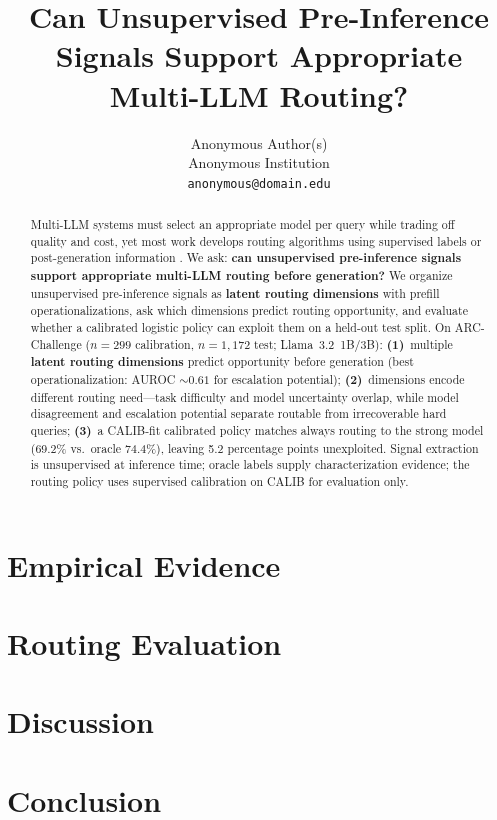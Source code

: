 \documentclass[11pt]{article}
\title{Can Unsupervised Pre-Inference Signals Support Appropriate Multi-LLM Routing?}
\author{
  Anonymous Author(s) \\
  Anonymous Institution \\
  \texttt{anonymous@domain.edu}
}
\begin{document}
\maketitle

\begin{abstract}
Multi-LLM systems must select an appropriate model per query while trading off quality and cost, yet most work develops routing algorithms using supervised labels or post-generation information \citep{ong2024routellm,guha2024smoothie}.
We ask: \textbf{can unsupervised pre-inference signals support appropriate multi-LLM routing before generation?}
We organize unsupervised pre-inference signals as \textbf{latent routing dimensions} with prefill operationalizations, ask which dimensions predict routing opportunity, and evaluate whether a calibrated logistic policy can exploit them on a held-out test split.
On ARC-Challenge ($n{=}299$ calibration, $n{=}1{,}172$ test; Llama~3.2~1B/3B): \textbf{(1)}~multiple \textbf{latent routing dimensions} predict opportunity before generation (best operationalization: AUROC ${\sim}0.61$ for escalation potential); \textbf{(2)}~dimensions encode different routing need---task difficulty and model uncertainty overlap, while model disagreement and escalation potential separate routable from irrecoverable hard queries; \textbf{(3)}~a CALIB-fit calibrated policy matches always routing to the strong model (69.2\% vs.\ oracle 74.4\%), leaving 5.2 percentage points unexploited.
Signal extraction is unsupervised at inference time; oracle labels supply characterization evidence; the routing policy uses supervised calibration on CALIB for evaluation only.
\end{abstract}









\section{Empirical Evidence}
\label{sec:characterization}


\section{Routing Evaluation}
\label{sec:routing}


\section{Discussion}
\label{sec:discussion}


\section{Conclusion}
\label{sec:conclusion}





\appendix

\end{document}
